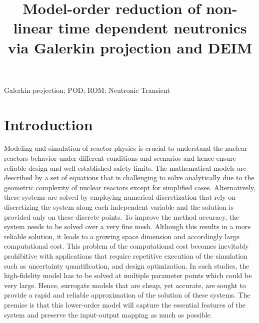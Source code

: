 \documentclass[]{interact}
\theoremstyle{plain}%
\theoremstyle{definition}
\theoremstyle{remark}
\begin{document}

\title{Model-order reduction of non-linear time dependent neutronics via Galerkin projection and DEIM}
\author{
}

\maketitle

\begin{abstract}

\end{abstract}

\begin{keywords}
Galerkin projection; POD; ROM; Neutronic Transient
\end{keywords}


\section{Introduction}

Modeling and simulation of reactor physics is crucial to understand the nuclear reactors behavior under different conditions and scenarios and hence ensure reliable design and well established safety limits.
The mathematical models are described by a set of equations that is challenging to solve analytically due to the geometric complexity of nuclear reactors except for simplified cases.
Alternatively, these systems are solved by employing numerical discretization that rely on discretizing the system along each independent variable and the solution is provided only on these discrete points.
To improve the method accuracy, the system needs to be solved over a very fine mesh.
Although this results in a more reliable solution, it leads to a growing space dimension and accordingly large computational cost.
This problem of the computational cost becomes inevitably prohibitive with applications that require repetitive execution of the simulation such as uncertainty quantification, and design optimization.
In such studies, the high-fidelity model has to be solved at multiple parameter points which could be very large.
Hence, surrogate models that are cheap, yet accurate, are sought to provide a rapid and reliable approximation of the solution of these systems.
The premise is that this lower-order model will capture the essential features of the system  and preserve the input-output mapping as much as possible.
\end{document}
